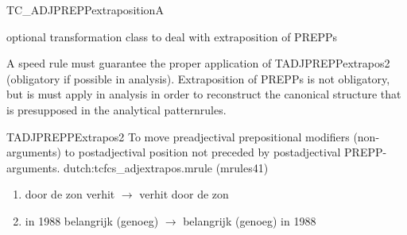 \begin{mruleclass}{TC\_ADJPREPPextrapositionA}
\begin{classdescr}
\kind optional transformation class
\classtask to deal with extraposition of PREPPs
\classremarks

\nofilters


\begin{speedrules}
\item 
A speed rule 
must guarantee the proper application of TADJPREPPextrapos2 (obligatory
if possible in analysis).
Extraposition of 
PREPPs is not obligatory, but is must apply in analysis in order
to reconstruct the canonical structure that is presupposed in the analytical 
patternrules.
\end{speedrules}

\noplannedrules

\norulesnotince

\end{classdescr}
\begin{members}
\begin{member}
 TADJPREPPExtrapos2
 To move preadjectival prepositional modifiers (non-arguments)
to postadjectival  position not preceded by postadjectival PREPP-arguments.
\file dutch:tcfcs\_adjextrapos.mrule (mrules41)
\semantics \nosemantics
\example \mbox{}

\begin{enumerate}
  \item
door de zon verhit   
$\rightarrow$  verhit door de zon
\item
in 1988 belangrijk (genoeg) $\rightarrow$ belangrijk (genoeg) in 1988 

\end{enumerate}
\remarks\mbox{}
\end{member}
\end{members}

\end{mruleclass}



